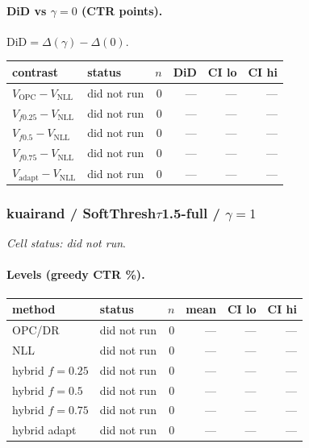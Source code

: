 \documentclass[10pt,a4paper]{article}
\begin{document}
\paragraph{DiD vs $\gamma=0$ (CTR points).} $\mathrm{DiD}=\Delta(\gamma)-\Delta(0)$.
{\centering\small\begin{tabular}{llrrrr}
\toprule contrast & status & $n$ & DiD & CI lo & CI hi \\
\midrule
$V_{\mathrm{OPC}}-V_{\mathrm{NLL}}$ & did not run & 0 & --- & --- & --- \\
$V_{f0.25}-V_{\mathrm{NLL}}$ & did not run & 0 & --- & --- & --- \\
$V_{f0.5}-V_{\mathrm{NLL}}$ & did not run & 0 & --- & --- & --- \\
$V_{f0.75}-V_{\mathrm{NLL}}$ & did not run & 0 & --- & --- & --- \\
$V_{\mathrm{adapt}}-V_{\mathrm{NLL}}$ & did not run & 0 & --- & --- & --- \\
\bottomrule\end{tabular}\par}
\bigskip
\subsubsection{kuairand / SoftThresh$\tau$1.5-full / $\gamma=1$}
\emph{Cell status: did not run}.
\paragraph{Levels (greedy CTR \%).}
{\centering\small\begin{tabular}{llrrrr}
\toprule method & status & $n$ & mean & CI lo & CI hi \\
\midrule
OPC/DR & did not run & 0 & --- & --- & --- \\
NLL & did not run & 0 & --- & --- & --- \\
hybrid $f{=}0.25$ & did not run & 0 & --- & --- & --- \\
hybrid $f{=}0.5$ & did not run & 0 & --- & --- & --- \\
hybrid $f{=}0.75$ & did not run & 0 & --- & --- & --- \\
hybrid adapt & did not run & 0 & --- & --- & --- \\
\bottomrule\end{tabular}\par}
\end{document}
